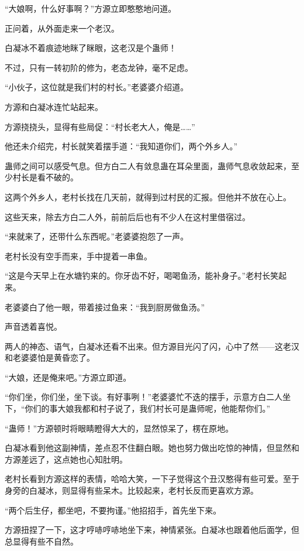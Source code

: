 
\begin{this_body}

“大娘啊，什么好事啊？”方源立即憨憨地问道。

正问着，从外面走来一个老汉。

白凝冰不着痕迹地眯了眯眼，这老汉是个蛊师！

不过，只有一转初阶的修为，老态龙钟，毫不足虑。

“小伙子，这位就是我们村的村长。”老婆婆介绍道。

方源和白凝冰连忙站起来。

方源挠挠头，显得有些局促：“村长老大人，俺是……”

他还未介绍完，村长就笑着摆手道：“我知道你们，两个外乡人。”

蛊师之间可以感受气息。但方白二人有敛息蛊在耳朵里面，蛊师气息收敛起来，至少村长是看不破的。

这两个外乡人，老村长找在几天前，就得到过村民的汇报。但他并不放在心上。

这些天来，除去方白二人外，前前后后也有不少人在这村里借宿过。

“来就来了，还带什么东西呢。”老婆婆抱怨了一声。

老村长没有空手而来，手中提着一串鱼。

“这是今天早上在水塘钓来的。你牙齿不好，喝喝鱼汤，能补身子。”老村长笑起来。

老婆婆白了他一眼，带着接过鱼来：“我到厨房做鱼汤。”

声音透着喜悦。

两人的神态、语气，白凝冰还看不出来。但方源目光闪了闪，心中了然——这老汉和老婆婆怕是黄昏恋了。

“大娘，还是俺来吧。”方源立即道。

“你们坐，你们坐，坐下谈。有好事咧！”老婆婆忙不迭的摆手，示意方白二人坐下，“你们的事大娘我都和村子说了，我们村长可是蛊师呢，他能帮你们。”

“蛊师！”方源顿时将眼睛瞪得大大的，显然惊呆了，楞在原地。

白凝冰看到他这副神情，差点忍不住翻白眼。她也努力做出吃惊的神情，但显然和方源差远了，这点她也心知肚明。

老村长看到方源这样的表情，哈哈大笑，一下子觉得这个丑汉憨得有些可爱。至于身旁的白凝冰，则显得有些呆木。比较起来，老村长反而更喜欢方源。

“两个后生仔，都坐吧，不要拘谨。”他招招手，首先坐下来。

方源扭捏了一下，这才哼哧哼哧地坐下来，神情紧张。白凝冰也跟着他后面学，但总显得有些不自然。


\end{this_body}
